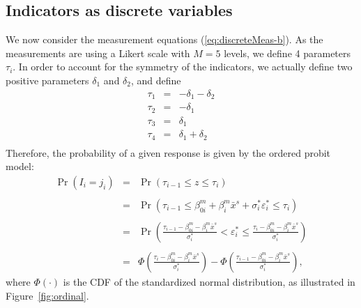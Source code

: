 \documentclass[12pt,a4paper]{article}
\newcommand{\req}[1]{(\ref{#1})}
\newcommand{\prob}{\operatorname{Pr}}
\begin{document}

\subsection{Indicators as discrete variables}
\label{sec:discrete}

We now consider the measurement equations
\req{eq:discreteMeas-b}.
As the measurements are using a Likert scale with $M=5$ levels, we
define 4 parameters $\tau_i$. In order to account for the symmetry of
the indicators, we actually define two positive parameters $\delta_1$ and
$\delta_2$, and define
\[
\begin{array}{rcl}
\tau_1 &=& -\delta_1 - \delta_2 \\
\tau_2 &=& -\delta_1 \\
\tau_3 &=& \delta_1 \\
\tau_4 &=& \delta_1 + \delta_2 \\
\end{array}
\]
Therefore, the probability of a given response is given by the ordered
probit model:
\begin{equation}
\label{eq:likelihoodOrderedProbit}
\begin{array}{rcl}
\prob(I_i = j_i) &=& \prob(\tau_{i-1} \leq z \leq \tau_i) \\ & \\
           &=& \prob(\tau_{i-1} \leq  \beta_{0i}^m +\beta^m_i \bar{x}^s +
\sigma^*_i \varepsilon_i^*  \leq \tau_i) \\ & \\
           &=& \prob\left(\frac{\tau_{i-1} - \beta_{0i}^m - \beta^m_i \bar{x}^s}{\sigma^*_i}
< 
 \varepsilon_i^*  \leq \frac{\tau_i - \beta_{0i}^m - \beta^m_i
 \bar{x}^s}{\sigma^*_i}\right) \\ & \\
&=&\Phi\left(\frac{\tau_i - \beta_{0i}^m - \beta^m_i
 \bar{x}^s}{\sigma^*_i}\right) - \Phi\left(\frac{\tau_{i-1} - \beta_{0i}^m - \beta^m_i \bar{x}^s}{\sigma^*_i}\right),
\end{array}
\end{equation}
where $\Phi(\cdot)$ is the CDF of the standardized normal
distribution, as illustrated in Figure~\ref{fig:ordinal}.
\end{document}
